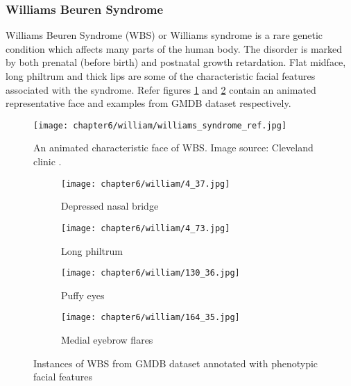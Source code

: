 \documentclass[../report.tex]{subfiles}
\begin{document}
	\subsubsection{Williams Beuren Syndrome}
	Williams Beuren Syndrome (WBS) or Williams syndrome is a rare genetic condition which affects many parts of the human body. The disorder is marked by both prenatal (before birth) and postnatal growth retardation. Flat midface, long philtrum and thick lips are some of the characteristic facial features associated with the syndrome. Refer figures \ref{fig_williams_char} and \ref{fig_wil_gmdb} contain an animated representative face and examples from GMDB dataset respectively. 
	\begin{figure}[H]
	\centering
	\texttt{[image: chapter6/william/williams\_syndrome\_ref.jpg]}	
	\caption[An animated characteristic face of WBS]{An animated characteristic face of WBS. Image source: Cleveland clinic \protect\footnotemark.}
	\label{fig_williams_char} 
	\end{figure}
	\begin{figure}[H]
		\centering
		\begin{subfigure}[t]{0.24\textwidth}
			\centering
			\texttt{[image: chapter6/william/4\_37.jpg]}
			\caption{Depressed nasal bridge}
		\end{subfigure}
		\begin{subfigure}[t]{0.24\textwidth}
			\centering
			\texttt{[image: chapter6/william/4\_73.jpg]}
			\caption{Long philtrum}
		\end{subfigure}	
			\begin{subfigure}[t]{0.24\textwidth}
			\centering
			\texttt{[image: chapter6/william/130\_36.jpg]}
			\caption{Puffy eyes}
		\end{subfigure}	
			\begin{subfigure}[t]{0.24\textwidth}
			\centering
			\texttt{[image: chapter6/william/164\_35.jpg]}
			\caption{Medial eyebrow flares}
		\end{subfigure}	
	\caption[Instances of WBS from GMDB dataset]{Instances of WBS from GMDB dataset annotated with phenotypic facial features}
	\label{fig_wil_gmdb}
	\end{figure}
\end{document}
